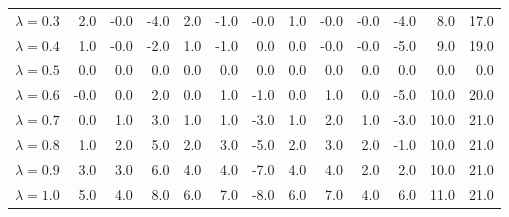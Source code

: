 \begin{table}[H]
{{\begin{tabular}{lrrrrrrrrrrrr}
\rule{0pt}{4ex}$\lambda=0.3$ & 2.0 & -0.0 & -4.0 & 2.0 & -1.0 & -0.0 & 1.0 & -0.0 & -0.0 & -4.0 & 8.0 & 17.0\\
$\lambda=0.4$ & 1.0 & -0.0 & -2.0 & 1.0 & -1.0 & 0.0 & 0.0 & -0.0 & -0.0 & -5.0 & 9.0 & 19.0\\
$\lambda=0.5$ & 0.0 & 0.0 & 0.0 & 0.0 & 0.0 & 0.0 & 0.0 & 0.0 & 0.0 & 0.0 & 0.0 & 0.0\\
$\lambda=0.6$ & -0.0 & 0.0 & 2.0 & 0.0 & 1.0 & -1.0 & 0.0 & 1.0 & 0.0 & -5.0 & 10.0 & 20.0\\
$\lambda=0.7$ & 0.0 & 1.0 & 3.0 & 1.0 & 1.0 & -3.0 & 1.0 & 2.0 & 1.0 & -3.0 & 10.0 & 21.0\\

\rule{0pt}{4ex}$\lambda=0.8$ & 1.0 & 2.0 & 5.0 & 2.0 & 3.0 & -5.0 & 2.0 & 3.0 & 2.0 & -1.0 & 10.0 & 21.0\\
$\lambda=0.9$ & 3.0 & 3.0 & 6.0 & 4.0 & 4.0 & -7.0 & 4.0 & 4.0 & 2.0 & 2.0 & 10.0 & 21.0\\
$\lambda=1.0$ & 5.0 & 4.0 & 8.0 & 6.0 & 7.0 & -8.0 & 6.0 & 7.0 & 4.0 & 6.0 & 11.0 & 21.0\\
\bottomrule
\end{tabular}
} %

} %
\label{tab:syst:lambda_ups1s}
\end{table}
